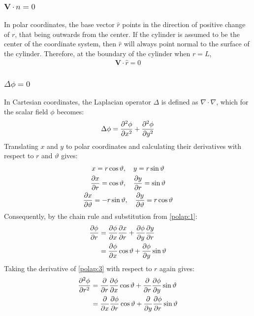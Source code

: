 \documentclass[a4paper,12pt]{article}
\newcommand{\rhat}{\hat{r}}
\newcommand{\nhat}{\hat{n}}
\renewcommand{\theta}{\vartheta}      		%
\newcommand{\partialder}[2]{\frac{\partial #1}{\partial #2}}        %
\begin{document}
\subsubsection{$\mathbf{V}\cdot\nhat=0$}\label{sec:vdotnhatzero}
In polar coordinates, the base vector $\rhat$ points in the direction of positive change of $r$, that being outwards from the center. If the cylinder is assumed to be the center of the coordinate system, then $\rhat$ will always point normal to the surface of the cylinder. Therefore, at the boundary of the cylinder when $r=L$,
$$\begin{matrix}
	\mathbf{V}\cdot\rhat=0
\end{matrix}$$

\subsubsection{$\Delta\phi=0$}\label{sec:deltaphizero}
In Cartesian coordinates, the Laplacian operator $\Delta$ is defined as $\nabla\cdot\nabla$, which for the scalar field $\phi$ becomes:
\begin{gather}
	\notag\Delta\phi=\frac{\partial^2\phi}{\partial x^2}+\frac{\partial^2\phi}{\partial y^2}
\end{gather}
Translating $x$ and $y$ to polar coordinates and calculating their derivatives with respect to $r$ and $\theta$ gives:
\begin{gather}
	\notag x=r\cos\theta,\quad y=r\sin\theta\\
	\label{polap:1}\partialder{x}{r}=\cos\theta,\quad\partialder{y}{r}=\sin\theta\\
	\label{polap:2}\partialder{x}{\theta}=-r\sin\theta,\quad\partialder{y}{\theta}=r\cos\theta
\end{gather}
Consequently, by the chain rule and substitution from \ref{polap:1}:
\begin{align}
	\notag\partialder{\phi}{r}&=\partialder{\phi}{x}\partialder{x}{r}+\partialder{\phi}{y}\partialder{y}{r}\\
	\label{polap:3}&=\partialder{\phi}{x}\cos\theta+\partialder{\phi}{y}\sin\theta
\end{align}
Taking the derivative of \ref{polap:3} with respect to $r$ again gives:
\begin{align}
	\notag\frac{\partial^2\phi}{\partial r^2}&=\partialder{}{r}\partialder{\phi}{x}\cos\theta+\partialder{}{r}\partialder{\phi}{y}\sin\theta\\
	\label{polap:4}&=\partialder{}{x}\partialder{\phi}{r}\cos\theta+\partialder{}{y}\partialder{\phi}{r}\sin\theta
\end{align}
\end{document}
